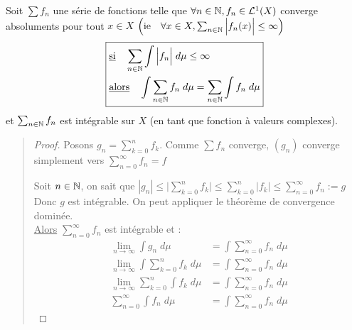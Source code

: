 \begin{theorem}
    Soit $ \sum f_n$ une série de fonctions telle que $ \forall n \in \mathbb{N}, f_n \in \mathcal{L}^1(X)$ converge absoluments pour tout $x \in X$
    $ \Big( \text{ie} \quad \forall x \in X, \sum_{n \in \mathbb{N}} \Big| f_n (x) \Big| \le \infty \Big)$
    \[ \boxed{
    \begin{aligned}
        & \text{\underline{si}} \quad  \sum_{n \in \mathbb{N}} \int \Big| f_n \Big| \; d \mu \le \infty \\
        & \text{\underline{alors}} \quad \int \sum_{n \in \mathbb{N}} f_n \; d \mu = \sum_{n \in \mathbb{N}} \int f_n \; d \mu 
    \end{aligned} }
    \]
    et $\sum_{n \in \mathbb{N}} f_n$ est intégrable sur $X$ (en tant que fonction à valeurs complexes).
\end{theorem}

\begin{quote}
\footnotesize
\begin{proof}
    Posons $g_n = \sum_{k=0}^{n} f_k$. Comme $\sum f_n$ converge, $(g_n)$ converge simplement vers $\sum_{n=0}^{\infty} f_n = f $

    Soit $n \in \mathbb{N}$, on sait que $ |g_n| \leq \Big| \sum_{k=0}^{n} f_k \Big| \leq \sum_{k=0}^{n} | f_k | \leq \sum_{n=0}^{\infty} f_n := g $
    Donc $g$ est intégrable. On peut appliquer le théorème de convergence dominée. \\
    \underline{Alors} $ \sum_{n=0}^{\infty} f_n$ est intégrable et :
    \begin{align*}
        \lim_{n \to \infty} \int g_n \; d \mu &= \int \sum_{n=0}^{\infty} f_n \; d \mu \\
        \lim_{n\to\infty} \int \sum_{k=0}^{n} f_k \; d \mu &= \int \sum_{n=0}^{\infty} f_n \; d \mu \\
        \lim_{n\to\infty} \sum_{k=0}^{n} \int f_k \; d \mu &= \int \sum_{n=0}^{\infty} f_n \; d \mu \\
        \sum_{n=0}^{\infty} \int f_n \; d \mu &= \int \sum_{n=0}^{\infty} f_n \; d \mu 
    \end{align*}
\end{proof}
\normalsize
\end{quote}
